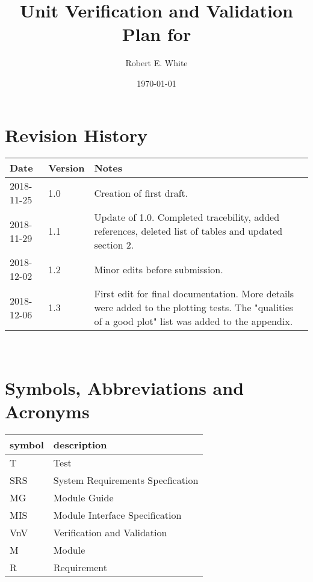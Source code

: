 \documentclass[12pt, titlepage]{article}
\begin{document}
\title{Unit Verification and Validation Plan for \progname{}} 
\author{Robert E. White}
\date{\today}
	
\maketitle


\section{Revision History}

\begin{tabularx}{\textwidth}{p{3cm}p{2cm}X}
\toprule {\bf Date} & {\bf Version} & {\bf Notes}\\
\midrule
2018-11-25 & 1.0 & Creation of first draft.\\
2018-11-29 & 1.1 & Update of 1.0. Completed tracebility, added references, 
deleted list of tables and updated section 2. \\ 
2018-12-02 & 1.2& Minor edits before submission. \\ 
2018-12-06 & 1.3& First edit for final documentation. More details were added 
to the plotting tests. The "qualities of a good plot" list was added to the 
appendix. \\
\bottomrule
\end{tabularx}

~\newpage

\tableofcontents

\listoftables


\listoffigures


\newpage

\section{Symbols, Abbreviations and Acronyms}

\renewcommand{\arraystretch}{1.2}
\begin{tabular}{l l} 
  \toprule		
  \textbf{symbol} & \textbf{description}\\
  \midrule 
  T & Test\\ 
  SRS & System Requirements Specfication\\ 
  MG & Module Guide\\ 
  MIS & Module Interface Specification\\ 
  VnV & Verification and Validation\\ 
  M & Module\\ 
  R & Requirement\\
  \bottomrule
\end{tabular}\\
\end{document}
